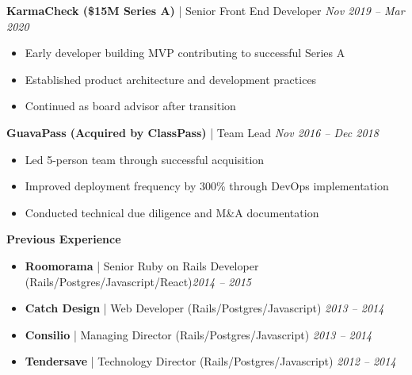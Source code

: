 \documentclass[letterpaper,10pt]{article}
\begin{document}
\textbf{KarmaCheck (\$15M Series A)} | Senior Front End Developer \hfill \textit{Nov 2019 -- Mar 2020}
\begin{itemize}[leftmargin=*, nosep]
    \item Early developer building MVP contributing to successful Series A
    \item Established product architecture and development practices
    \item Continued as board advisor after transition
\end{itemize}

\textbf{GuavaPass (Acquired by ClassPass)} | Team Lead \hfill \textit{Nov 2016 -- Dec 2018}
\begin{itemize}[leftmargin=*, nosep]
    \item Led 5-person team through successful acquisition
    \item Improved deployment frequency by 300\% through DevOps implementation
    \item Conducted technical due diligence and M\&A documentation
\end{itemize}

\textbf{Previous Experience}
\begin{itemize}[leftmargin=*, nosep]
    \item \textbf{Roomorama} | Senior Ruby on Rails Developer (Rails/Postgres/Javascript/React)\hfill \textit{2014 -- 2015}
    \item \textbf{Catch Design} | Web Developer (Rails/Postgres/Javascript) \hfill \textit{2013 -- 2014}
    \item \textbf{Consilio} | Managing Director  (Rails/Postgres/Javascript) \hfill \textit{2013 -- 2014}
    \item \textbf{Tendersave} | Technology Director (Rails/Postgres/Javascript) \hfill \textit{2012 -- 2014}
\end{itemize}
\end{document}
